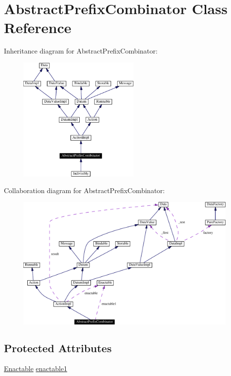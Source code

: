 \hypertarget{classAbstractPrefixCombinator}{
\section{Abstract\-Prefix\-Combinator  Class Reference}
\label{classAbstractPrefixCombinator}
}
Inheritance diagram for Abstract\-Prefix\-Combinator:\begin{figure}[H]
\begin{center}
\leavevmode
\includegraphics[width=170pt]{classAbstractPrefixCombinator__inherit__graph}
\end{center}
\end{figure}
Collaboration diagram for Abstract\-Prefix\-Combinator:\begin{figure}[H]
\begin{center}
\leavevmode
\includegraphics[width=312pt]{classAbstractPrefixCombinator__coll__graph}
\end{center}
\end{figure}
\subsection*{Protected Attributes}
\begin{CompactItemize}
\item 
\hyperlink{interfaceEnactable}{Enactable} \hyperlink{classAbstractPrefixCombinator_n0}{enactable1}
\end{CompactItemize}
